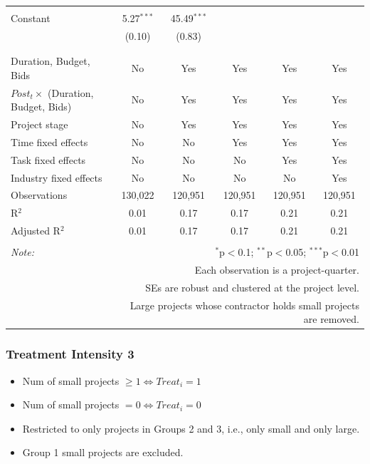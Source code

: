 \documentclass[
]{article}
\providecommand{\tightlist}{%
  \setlength{\itemsep}{0pt}\setlength{\parskip}{0pt}}
\begin{document}
\begin{table}[H]
\begin{tabular}{@{\extracolsep{-2pt}}lccccc}
  & & & & & \\ 
 Constant & 5.27$^{***}$ & 45.49$^{***}$ &  &  &  \\ 
  & (0.10) & (0.83) &  &  &  \\ 
  & & & & & \\ 
\hline \\[-1.8ex] 
Duration, Budget, Bids & No & Yes & Yes & Yes & Yes \\ 
$Post_t \times $  (Duration, Budget, Bids) & No & Yes & Yes & Yes & Yes \\ 
Project stage & No & Yes & Yes & Yes & Yes \\ 
Time fixed effects & No & No & Yes & Yes & Yes \\ 
Task fixed effects & No & No & No & Yes & Yes \\ 
Industry fixed effects & No & No & No & No & Yes \\ 
Observations & 130,022 & 120,951 & 120,951 & 120,951 & 120,951 \\ 
R$^{2}$ & 0.01 & 0.17 & 0.17 & 0.21 & 0.21 \\ 
Adjusted R$^{2}$ & 0.01 & 0.17 & 0.17 & 0.21 & 0.21 \\ 
\hline 
\hline \\[-1.8ex] 
\textit{Note:}  & \multicolumn{5}{r}{$^{*}$p$<$0.1; $^{**}$p$<$0.05; $^{***}$p$<$0.01} \\ 
 & \multicolumn{5}{r}{Each observation is a project-quarter.} \\ 
 & \multicolumn{5}{r}{SEs are robust and clustered at the project level.} \\ 
 & \multicolumn{5}{r}{Large projects whose contractor holds small projects are removed.} \\ 
\end{tabular} 
\end{table}

\hypertarget{treatment-intensity-3}{%
\subsubsection{Treatment Intensity 3}\label{treatment-intensity-3}}

\begin{itemize}
\tightlist
\item
  Num of small projects \(\geq 1 \iff Treat_i = 1\)
\item
  Num of small projects \(=0 \iff Treat_i = 0\)
\item
  Restricted to only projects in Groups 2 and 3, i.e., only small and
  only large.
\item
  Group 1 small projects are excluded.
\end{itemize}
\end{document}
